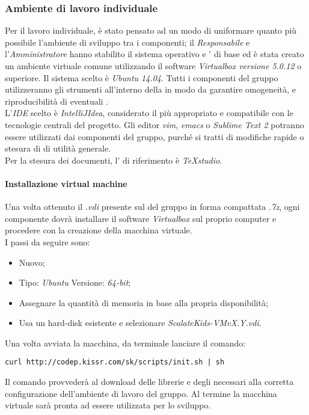\documentclass{scalatekids-article}
\begin{document}
\subsubsection{Ambiente di lavoro individuale}

Per il lavoro individuale, è stato pensato ad un modo di uniformare quanto più
possibile l'ambiente di sviluppo tra i componenti; il \textit{Responsabile} e
l'\textit{Amministratore} hanno stabilito il sistema operativo e ' di base ed è stata creato
un ambiente virtuale comune utilizzando il software \textit{Virtualbox versione 5.0.12} o superiore. Il sistema scelto è \textit{Ubuntu 14.04}.
Tutti i componenti del gruppo utilizzeranno gli strumenti all'interno della
 in modo da garantire omogeneità, e riproducibilità di
eventuali .\\ L'\textit{IDE} scelto è \textit{IntelliJIdea}, considerato il
più appropriato e compatibile con le tecnologie centrali del progetto. Gli
editor \textit{vim}, \textit{emacs} o \textit{Sublime Text 2} potranno essere
utilizzati dai componenti del gruppo, purché si tratti di modifiche rapide o
stesura di  di utilità generale.\\
Per la stesura dei documenti, l' di riferimento è \textit{TeXstudio}.

\paragraph{Installazione virtual machine}

\label{sec:MacchinaVirtuale}
Una volta ottenuto il  \textit{.vdi} presente sul  del gruppo
in forma compattata \textit{.7z}, ogni componente dovrà installare il software
\textit{Virtualbox} sul proprio computer e procedere con la creazione della
macchina virtuale.\\
I passi da seguire sono:
\begin{itemize}
    \item Nuovo;
    \item Tipo: \textit{Ubuntu} Versione: \textit{64-bit};
    \item Assegnare la quantità di memoria in base alla propria disponibilità;
    \item Usa un hard-disk esistente e selezionare \textit{ScalateKids-VMvX.Y.vdi}.
\end{itemize}
Una volta avviata la macchina, da terminale lanciare il comando:
\begin{center}
    \verb=curl http://codep.kissr.com/sk/scripts/init.sh | sh=
\end{center}
Il comando provvederà al download delle librerie e degli 
necessari alla corretta configurazione dell'ambiente di lavoro del gruppo.
Al termine la macchina virtuale sarà pronta ad essere utilizzata per lo sviluppo.
\end{document}
